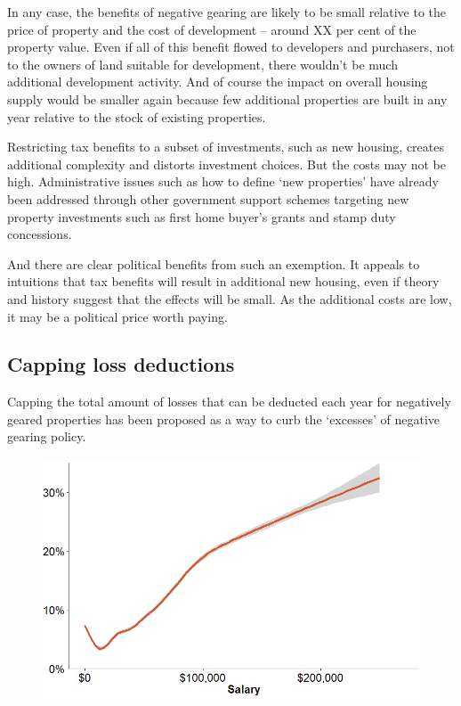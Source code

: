 \documentclass{grattan}\usepackage[]{graphicx}\usepackage[]{color}
\begin{document}
In any case, the benefits of negative gearing are likely to be small relative to the price of property and the cost of development -- around XX per cent of the property value.  Even if all of this benefit flowed to developers and purchasers, not to the owners of land suitable for development, there wouldn't be much additional development activity. And of course the impact on overall housing supply would be smaller again because few additional properties are built in any year relative to the stock of existing properties. 

Restricting tax benefits to a subset of investments, such as new housing, creates additional complexity and distorts investment choices. But the costs may not be high. Administrative issues such as how to define `new properties' have already been addressed through  other government support schemes targeting new property investments such as first home buyer's grants and stamp duty concessions. 

And there are clear political benefits from such an exemption.  It appeals to intuitions that tax benefits will result in additional new housing, even if theory and history suggest that the effects will be small.  As the additional costs are low, it may be a political price worth paying.

\subsection{Capping loss deductions}
Capping the total amount of losses that can be deducted each year for negatively geared properties has been proposed as a way to curb the `excesses' of negative gearing policy. 

\begin{figure}

\includegraphics[width=\columnwidth]{CGT-NG-atlas//NG-vs-salary-1}
\end{figure}
\end{document}
